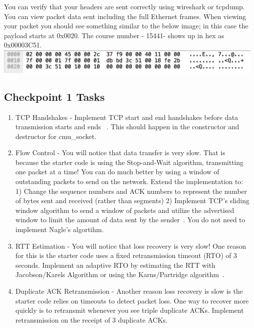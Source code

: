 You can verify that your headers are sent correctly using wireshark or tcpdump. You can view packet data sent including the full Ethernet frames. When viewing your packet you should see something similar to the below image; in this case the payload starts at 0x0020. The course number - 15441- shows up in hex as 0x00003C51.\\
  
\includegraphics[scale=0.75]{sample_data.png}

\subsection{Checkpoint 1 Tasks }
\begin{enumerate}
    \item TCP Handshakes - Implement TCP start and end handshakes before data transmission starts and ends ~\cite{tcp-conn-state}. This should happen in the constructor and destructor for cmu\_socket. 
    \item Flow Control - You will notice that data transfer is very slow. That is because the starter code is using the Stop-and-Wait algorithm, transmitting one packet at a time! You can do much better by using a window of outstanding packets to send on the network. Extend the implementation to: 1) Change the sequence numbers and ACK numbers to represent the number of bytes sent and received (rather than segments) 2) Implement TCP's sliding window algorithm to send a window of packets and utilize the advertised window to limit the amount of data sent by the sender~\cite{sliding-window}. You do not need to implement Nagle's algortihm.
    \item RTT Estimation -  You will notice that loss recovery is very slow! One reason for this is the starter code uses a fixed retransmission timeout (RTO) of 3 seconds. Implement an adaptive RTO by estimating the RTT with Jacobson/Karels Algorithm or using the Karns/Partridge algorithm~\cite{rto-implementation}. 
    \item Duplicate ACK Retransmission -  Another reason loss recovery is slow is the starter code relies on timeouts to detect packet loss. One way to recover more quickly is to retransmit whenever you see triple duplicate ACKs. Implement retransmission on the receipt of 3 duplicate ACKs.
\end{enumerate}


